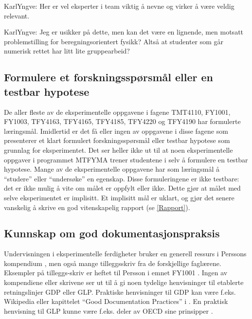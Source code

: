\documentclass{article}
\begin{document}
{\color{red} KarlYngve: Her er vel eksperter i team viktig å nevne og virker å være veldig relevant.}


{\color{red} KarlYngve: Jeg er usikker på dette, men kan det være en lignende, men motsatt problemstilling for beregningsorientert fysikk? Altså at studenter som går numerisk rettet har litt lite gruppearbeid?}

\subsection{Formulere et forskningsspørsmål eller en testbar hypotese}
De aller fleste av de eksperimentelle oppgavene i fagene TMT4110, FY1001, FY1003, TFY4163, TFY4165, TFY4185, TFY4220 og TFY4190 har formulerte læringsmål. Imidlertid er det få eller ingen av oppgavene i disse fagene som presenterer et klart formulert forskningsspørsmål eller testbar hypotese som grunnlag for eksperimentet. Det ser heller ikke ut til at noen eksperimentelle oppgaver i programmet MTFYMA trener studentene i selv å formulere en testbar hypotese.
Mange av de eksperimentelle oppgavene har som læringsmål å ``studere'' eller ``undersøke'' en egenskap. Disse formuleringene er ikke testbare: det er ikke mulig å vite om målet er oppfylt eller ikke. Dette gjør at målet med selve eksperimentet er implisitt. Et implisitt mål er uklart, og gjør det senere vanskelig å skrive en god vitenskapelig rapport (se \cref{Rapport}).

\subsection{Kunnskap om god dokumentasjonspraksis}
Undervisningen i eksperimentelle ferdigheter bruker en generell ressurs i Perssons kompendium \cite{Persson2020}, men også mange tilleggsskriv fra de forskjellige faglærene. Eksempler på tilleggs-skriv er heftet til Persson i emnet FY1001 \cite{Persson2020FY1001}. Ingen av kompendiene eller skrivene ser ut til å gi noen tydelige henvisninger til etablerte retningslinjer GDP eller GLP. Praktiske henvisninger til GDP kan være f.eks. Wikipedia \cite{WikiGDP} eller kapittelet ``Good Documentation Practices'' i \cite{Davani2017}. En praktisk henvisning til GLP kunne være f.eks. deler av OECD sine prinsipper \cite{OECD1997}.
\end{document}
